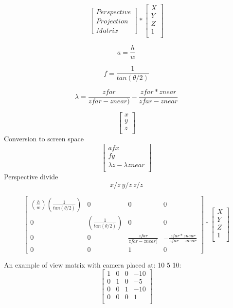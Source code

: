 \[
\begin{bmatrix}
Perspective\\
Projection \\
Matrix
\end{bmatrix} 
*
\begin{bmatrix}
X\\
Y\\
Z\\
1\\
\end{bmatrix} 
\]

\[
a=\frac{h}{w}
\]

\[
f=\frac{1}{tan(\theta / 2)}
\]

\[
\lambda=\frac{zfar}{zfar - znear)}
-
\frac{zfar * znear}{zfar-znear}
\]

\[
\begin{bmatrix}
x\\
y\\
z\\
\end{bmatrix}
\]
Conversion to screen space
\[
\begin{bmatrix}
afx\\
fy\\
\lambda z-\lambda znear\\
\end{bmatrix}
\]
Perspective divide
\[
x/z\ y/z\ z/z
\]

\[
\begin{bmatrix}
(\frac{h}{w})(\frac{1}{tan(\theta/2)}) & 0 & 0 & 0\\
0 & (\frac{1}{tan(\theta/2)}) & 0 & 0\\
0 & 0 & \frac{zfar}{zfar - znear)} & -\frac{zfar * znear}{zfar-znear}\\
0 & 0 & 1 & 0
\end{bmatrix} 
*
\begin{bmatrix}
X\\
Y\\
Z\\
1\\
\end{bmatrix} 
\]

An example of view matrix with camera placed at: 10 5 10:
\[
\begin{bmatrix}
1 & 0 & 0 & -10\\
0 & 1 & 0 & -5\\
0 & 0 & 1 & -10\\
0 & 0 & 0 & 1\\
\end{bmatrix} 
\]

